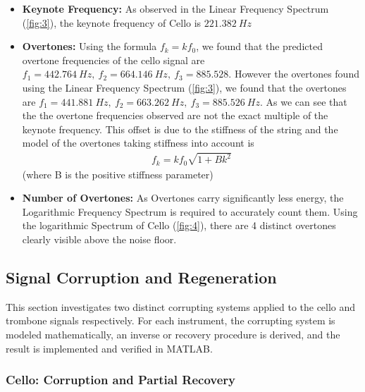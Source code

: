 \documentclass[12pt, a4paper]{article}
\begin{document}
\begin{itemize}
    \item \textbf{Keynote Frequency:} As observed in the Linear Frequency Spectrum (\autoref{fig:3}), the keynote frequency of Cello is $221.382\ Hz$
    \item \textbf{Overtones: }Using the formula $f_k = kf_0$, we found that the predicted overtone frequencies of the cello signal are $f_1 = 442.764\ Hz,\ f_2 = 664.146\ Hz,\ f_3 = 885.528$.
    However the overtones found using the Linear Frequency Spectrum (\autoref{fig:3}), we found that the overtones are $f_1 = 441.881\ Hz,\ f_2 = 663.262\ Hz,\ f_3 = 885.526\ Hz$. As we can see that the the overtone frequencies observed are not the exact multiple of the  keynote frequency. This offset is due to the stiffness of the string and the model of the overtones taking stiffness into account is 
    \begin{align*}
        f_k = kf_0\sqrt{1 + Bk^2}
    \end{align*}
    (where B is the positive stiffness parameter)
    \item \textbf{Number of Overtones:} As Overtones carry significantly less energy, the Logarithmic Frequency Spectrum is required to accurately count them. Using the logarithmic Spectrum of Cello (\autoref{fig:4}), there are 4 distinct overtones clearly visible above the noise floor.
\end{itemize}

\subsection{Signal Corruption and Regeneration}

This section investigates two distinct corrupting systems applied to the cello and trombone signals respectively. For each instrument, the corrupting system is modeled mathematically, an inverse or recovery procedure is derived, and the result is implemented and verified in MATLAB.

\subsubsection{Cello: Corruption and Partial Recovery}
\end{document}
